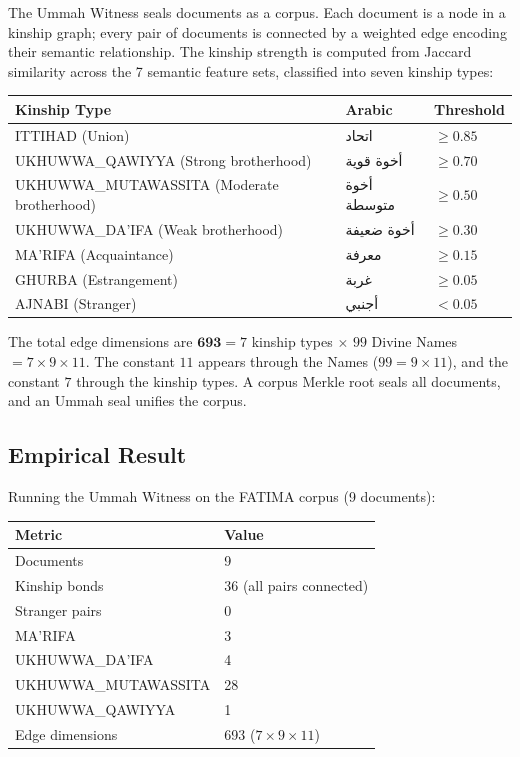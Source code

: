 \documentclass[11pt,a4paper]{article}
\begin{document}
The Ummah Witness seals documents as a corpus. Each document is a node in a kinship graph; every pair of documents is connected by a weighted edge encoding their semantic relationship. The kinship strength is computed from Jaccard similarity across the 7 semantic feature sets, classified into seven kinship types:

\begin{center}
\small
\begin{tabular}{lll}
\toprule
\textbf{Kinship Type} & \textbf{Arabic} & \textbf{Threshold} \\
\midrule
ITTIHAD (Union) & اتحاد & $\geq 0.85$ \\
UKHUWWA\_QAWIYYA (Strong brotherhood) & أخوة قوية & $\geq 0.70$ \\
UKHUWWA\_MUTAWASSITA (Moderate brotherhood) & أخوة متوسطة & $\geq 0.50$ \\
UKHUWWA\_DA'IFA (Weak brotherhood) & أخوة ضعيفة & $\geq 0.30$ \\
MA'RIFA (Acquaintance) & معرفة & $\geq 0.15$ \\
GHURBA (Estrangement) & غربة & $\geq 0.05$ \\
AJNABI (Stranger) & أجنبي & $< 0.05$ \\
\bottomrule
\end{tabular}
\end{center}

The total edge dimensions are $\mathbf{693} = 7$ kinship types $\times$ $99$ Divine Names $= 7 \times 9 \times 11$. The constant $11$ appears through the Names ($99 = 9 \times 11$), and the constant $7$ through the kinship types. A corpus Merkle root seals all documents, and an Ummah seal unifies the corpus.

\subsection{Empirical Result}

Running the Ummah Witness on the FATIMA corpus (9 documents):

\begin{center}
\begin{tabular}{ll}
\toprule
\textbf{Metric} & \textbf{Value} \\
\midrule
Documents & 9 \\
Kinship bonds & 36 (all pairs connected) \\
Stranger pairs & 0 \\
MA'RIFA & 3 \\
UKHUWWA\_DA'IFA & 4 \\
UKHUWWA\_MUTAWASSITA & 28 \\
UKHUWWA\_QAWIYYA & 1 \\
Edge dimensions & 693 ($7 \times 9 \times 11$) \\
\bottomrule
\end{tabular}
\end{center}
\end{document}
